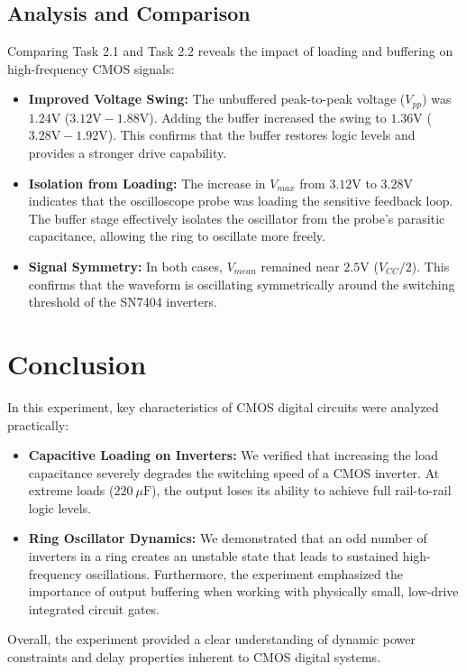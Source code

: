 \documentclass[12pt]{article}
\begin{document}
\subsection*{Analysis and Comparison}
Comparing Task 2.1 and Task 2.2 reveals the impact of loading and buffering on high-frequency CMOS signals:

\begin{itemize}
    \item \textbf{Improved Voltage Swing:} The unbuffered peak-to-peak voltage ($V_{pp}$) was $1.24\text{V}$ ($3.12\text{V} - 1.88\text{V}$). Adding the buffer increased the swing to $1.36\text{V}$ ($3.28\text{V} - 1.92\text{V}$). This confirms that the buffer restores logic levels and provides a stronger drive capability.
    
    \item \textbf{Isolation from Loading:} The increase in $V_{max}$ from $3.12\text{V}$ to $3.28\text{V}$ indicates that the oscilloscope probe was loading the sensitive feedback loop. The buffer stage effectively isolates the oscillator from the probe's parasitic capacitance, allowing the ring to oscillate more freely.
    
    \item \textbf{Signal Symmetry:} In both cases, $V_{mean}$ remained near $2.5\text{V}$ ($V_{CC}/2$). This confirms that the waveform is oscillating symmetrically around the switching threshold of the SN7404 inverters.
\end{itemize}

\section*{Conclusion}

In this experiment, key characteristics of CMOS digital circuits were analyzed practically:
\begin{itemize}
    \item \textbf{Capacitive Loading on Inverters:} We verified that increasing the load capacitance severely degrades the switching speed of a CMOS inverter. At extreme loads ($220\ \mu\text{F}$), the output loses its ability to achieve full rail-to-rail logic levels.
    \item \textbf{Ring Oscillator Dynamics:} We demonstrated that an odd number of inverters in a ring creates an unstable state that leads to sustained high-frequency oscillations. Furthermore, the experiment emphasized the importance of output buffering when working with physically small, low-drive integrated circuit gates.
\end{itemize}
Overall, the experiment provided a clear understanding of dynamic power constraints and delay properties inherent to CMOS digital systems.
\end{document}
